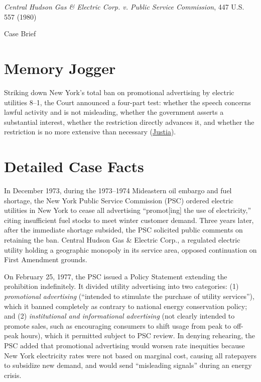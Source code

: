 \documentclass[12pt]{article}
\begin{document}
\begin{center}
{\LARGE \textit{Central Hudson Gas \& Electric Corp. v. Public Service Commission}, 447 U.S. 557 (1980)\par}
\vspace{0.8em}
{\large Case Brief\par}
\end{center}
\vspace{1em}

\section{Memory Jogger}
Striking down New York's total ban on promotional advertising by electric utilities 8--1, the Court announced a four-part test: whether the speech concerns lawful activity and is not misleading, whether the government asserts a substantial interest, whether the restriction directly advances it, and whether the restriction is no more extensive than necessary (\href{https://supreme.justia.com/cases/federal/us/447/557/}{Justia}).

\section{Detailed Case Facts}
In December 1973, during the 1973--1974 Mideastern oil embargo and fuel shortage, the New York Public Service Commission (PSC) ordered electric utilities in New York to cease all advertising ``promot[ing] the use of electricity,'' citing insufficient fuel stocks to meet winter customer demand. Three years later, after the immediate shortage subsided, the PSC solicited public comments on retaining the ban. Central Hudson Gas \& Electric Corp., a regulated electric utility holding a geographic monopoly in its service area, opposed continuation on First Amendment grounds.

On February 25, 1977, the PSC issued a Policy Statement extending the prohibition indefinitely. It divided utility advertising into two categories: (1) \emph{promotional advertising} (``intended to stimulate the purchase of utility services''), which it banned completely as contrary to national energy conservation policy; and (2) \emph{institutional and informational advertising} (not clearly intended to promote sales, such as encouraging consumers to shift usage from peak to off-peak hours), which it permitted subject to PSC review. In denying rehearing, the PSC added that promotional advertising would worsen rate inequities because New York electricity rates were not based on marginal cost, causing all ratepayers to subsidize new demand, and would send ``misleading signals'' during an energy crisis.
\end{document}
